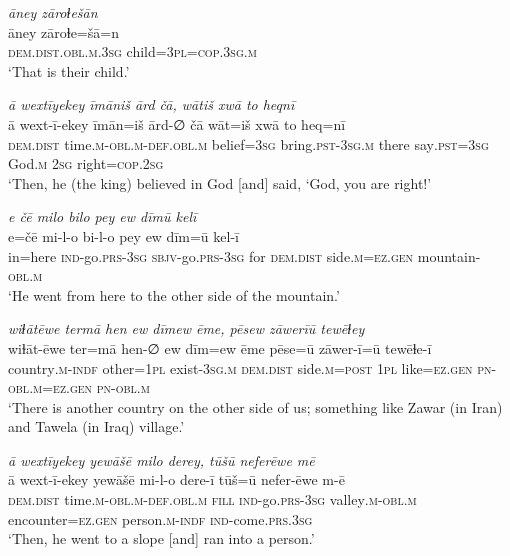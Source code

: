 \ea \label{KŠ.102}
\textit{āney zāroɫešān} \\ 
\gll āney zāroɫe=šā=n \\ 
 \textsc{dem.dist}\textsc{.obl}\textsc{.m}\textsc{.3sg} child\textsc{=3pl}\textsc{=cop}\textsc{.3sg}\textsc{.m} \\ 
\glt `That is their child.'
\z 
 
\ea \label{KŠ.104}
\textit{ā wextīyekey īmāniš ārd čā, wātiš xwā to heqnī} \\ 
\gll ā wext-ī-ekey īmān=iš ārd-∅ čā wāt=iš xwā to heq=nī \\ 
 \textsc{dem.dist} time\textsc{.m}\textsc{-obl}\textsc{.m}\textsc{-def}\textsc{.obl}\textsc{.m} belief\textsc{=3sg} bring\textsc{.pst}\textsc{-3sg}\textsc{.m} there say\textsc{.pst}\textsc{=3sg} God\textsc{.m} \textsc{2sg} right\textsc{=cop}\textsc{.\textsc{2sg}} \\ 
\glt `Then, he (the king) believed in God [and] said, ‘God, you are right!'
\z 
 
\ea \label{ŽH.5}
\textit{e čē milo bilo pey ew dīmū kelī} \\ 
\gll e=čē mi-l-o bi-l-o pey ew dīm=ū kel-ī \\ 
 in=here \textsc{ind-}go\textsc{.prs}\textsc{-3sg} \textsc{sbjv-}go\textsc{.prs}\textsc{-3sg} for \textsc{dem.dist} side\textsc{.m}\textsc{=ez}\textsc{.gen} mountain\textsc{-obl}\textsc{.m} \\ 
\glt `He went from here to the other side of the mountain.'
\z 
 
\ea \label{ŽH.6}
\textit{wiɫātēwe termā hen ew dīmew ēme, pēsew zāwerīū tewēɫey} \\ 
\gll wiɫāt-ēwe ter=mā hen-∅ ew dīm=ew ēme pēse=ū zāwer-ī=ū tewēɫe-ī \\ 
 country\textsc{.m}\textsc{-indf} other\textsc{=1pl} exist\textsc{-3sg}\textsc{.m} \textsc{dem.dist} side\textsc{.m}\textsc{=\textsc{post}} \textsc{1pl} like\textsc{=ez}\textsc{.gen} \textsc{pn}\textsc{-obl}\textsc{.m}\textsc{=ez}\textsc{.gen} \textsc{pn}\textsc{-obl}\textsc{.m} \\ 
\glt `There is another country on the other side of us; something like Zawar (in Iran) and Tawela (in Iraq) village.'
\z 
 
\ea \label{ŽH.8}
\textit{ā wextīyekey yewāšē milo derey, tūšū neferēwe mē} \\ 
\gll ā wext-ī-ekey yewāšē mi-l-o dere-ī tūš=ū nefer-ēwe m-ē \\ 
 \textsc{dem.dist} time\textsc{.m}\textsc{-obl}\textsc{.m}\textsc{-def}\textsc{.obl}\textsc{.m} \textsc{fill} \textsc{ind-}go\textsc{.prs}\textsc{-3sg} valley\textsc{.m}\textsc{-obl}\textsc{.m} encounter\textsc{=ez}\textsc{.gen} person\textsc{.m}\textsc{-indf} \textsc{ind-}come\textsc{.prs}\textsc{.3sg} \\ 
\glt `Then, he went to a slope [and] ran into a person.'
\z 
 
